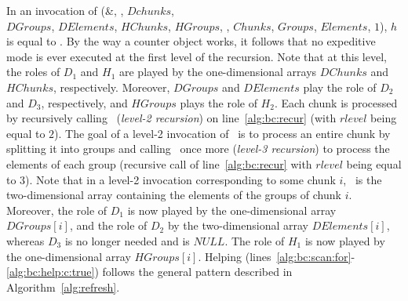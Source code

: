 % 
In an invocation of
\Traverse(\&\BufferCreation, \RawData, $\mathit{Dchunks}$, \\ $\mathit{DGroups}$, $\mathit{DElements}$,
$\mathit{HChunks}$, $\mathit{HGroups}$, \False, $\mathit{Chunks}$, $\mathit{Groups}$, $\mathit{Elements}$, $1$),
$h$ is equal to \False. By the way a counter object works, it follows that 
no expeditive mode is ever executed at the first level of the recursion.
Note that at this level, the roles of $D_1$ and $H_1$ are played by the one-dimensional arrays
$DChunks$ and $HChunks$, respectively. Moreover, $DGroups$ and $DElements$ play the role of $D_2$ and $D_3$,
respectively, and $HGroups$ plays the role of $H_2$. Each chunk is processed by recursively calling
\Traverse\ ({\em level-2 recursion}) on line~\ref{alg:bc:recur} (with $\mathit{rlevel}$ being equal to $2$). 
The goal of a level-2 invocation of \Traverse\
is to process an entire chunk by splitting it into groups and calling
\Traverse\ once more ({\em level-3 recursion}) to process the elements of each group 
(recursive call of line~\ref{alg:bc:recur} with $\mathit{rlevel}$ being equal to $3$). 
Note that in a level-2 invocation corresponding to some chunk $i$, 
\RawData\ is the two-dimensional array containing the elements of the groups of chunk $i$.
Moreover, the role of $D_1$ is now played by the one-dimensional array $DGroups[i]$, 
and the role of $D_2$ by the two-dimensional array $DElements[i]$,
whereas $D_3$ is no longer needed and is $\mathit{NULL}$.
The role of $H_1$ is now played by the one-dimensional array $HGroups[i]$. 
Helping (lines~\ref{alg:bc:scan:for}-\ref{alg:bc:help:c:true}) follows the general pattern
described in Algorithm~\ref{alg:refresh}. 



